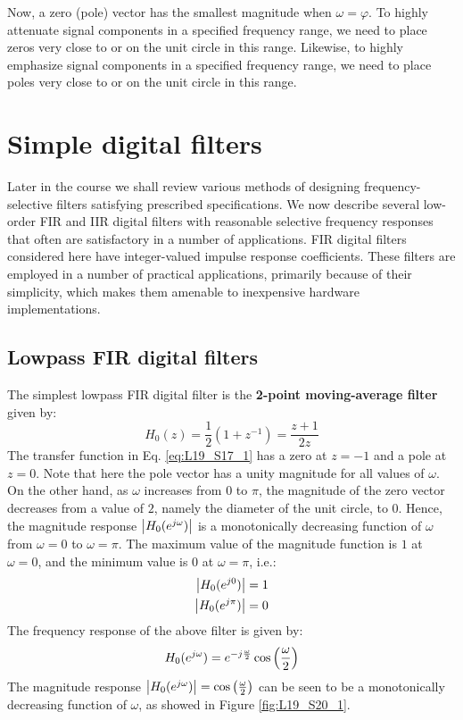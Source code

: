 \documentclass[../../main/main.tex]{subfiles}
\begin{document}
Now, a zero (pole) vector has the smallest magnitude when \( \omega = \varphi \). To highly attenuate signal components in a specified frequency range, we need to place zeros very close to or on the unit circle in this range.
Likewise, to highly emphasize signal components in a specified frequency range, we need to place poles very close to or on the unit circle in this range.





\section{Simple digital filters}
Later in the course we shall review various methods of designing frequency-selective filters satisfying prescribed specifications. We now describe several low-order FIR and IIR digital filters with reasonable selective frequency responses that often are satisfactory in a number of applications.
FIR digital filters considered here have integer-valued impulse response coefficients. These filters are employed in a number of practical applications, primarily because of their simplicity, which makes them amenable to inexpensive hardware implementations.



\subsection{Lowpass FIR digital filters}
The simplest lowpass FIR digital filter is the \textbf{2-point moving-average filter} given by:
\begin{equation}
    H_{0}(z)
    =
    \frac{1}{2} (1+z^{-1})
    =
    \frac{z+1}{2z}
    \label{eq:L19_S17_1}
\end{equation}
The transfer function in Eq. \ref{eq:L19_S17_1} has a zero at \( z = -1 \) and a pole at \( z = 0 \). Note that here the pole vector has a unity magnitude for all values of \( \omega \).
On the other hand, as \( \omega \) increases from \( 0 \) to \( \pi \), the magnitude of the zero vector decreases from a value of \( 2 \), namely the diameter of the unit circle, to \( 0 \). Hence, the magnitude response \( \abs{H_{0}(e^{j\omega})} \) is a monotonically decreasing function of \( \omega \) from \( \omega = 0 \) to \( \omega = \pi \).
The maximum value of the magnitude function is \( 1 \) at \( \omega = 0 \), and the minimum value is \( 0 \) at \( \omega = \pi \), i.e.:
\begin{align}
    \abs{H_{0}(e^{j0})} &= 1    \\
    \abs{H_{0}(e^{j\pi})} &= 0
\end{align}
The frequency response of the above filter is given by:
\begin{equation}
    H_{0}(e^{j\omega})
    =
    e^{-j\frac{\omega}{2}} \cos\qty(\frac{\omega}{2})
    \label{eq:L19_S19_2}
\end{equation}
The magnitude response \( \abs{H_{0}(e^{j\omega})} = \cos\qty(\frac{\omega}{2}) \) can be seen to be a monotonically decreasing function of \( \omega \), as showed in Figure \ref{fig:L19_S20_1}.
\end{document}
